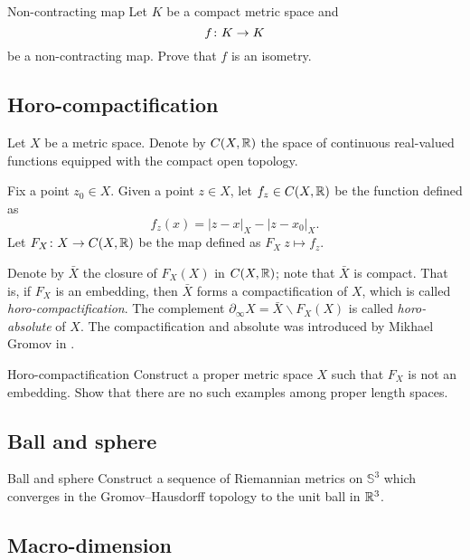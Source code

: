 \begin{pr}{\easy}{Non-contracting map}\label{Noncontracting map}
Let $K$  be a compact metric space and
\[f\:K\z\to K\] 
be a non-contracting map.
Prove that $f$ is an isometry.
\end{pr}


\subsection*{Horo-compactification\easy}

Let $X$ be a metric space.
Denote by $C(X,\mathbb{R})$ the space of continuous real-valued functions
equipped with the compact open topology.

Fix a point $z_0\in X$.
Given a point $z\in X$, let $f_z\in C(X,\mathbb{R})$ be the function defined as 
\[f_z(x)=|z-x|_X-|z-x_0|_X.\]
Let $F_X\colon X\to C(X,\mathbb{R})$ be the map 
defined as $F_X\:z\mapsto f_z$.

Denote by $\bar X$ 
the closure of $F_X(X)$ in $C(X,\mathbb{R})$;
note that $\bar X$ is compact.
That is, 
if $F_X$ is an embedding, 
then $\bar X$ forms a compactification of $X$,
which is called \emph{horo-compactification}.
The complement 
$\partial_\infty X=\bar X\backslash F_X(X)$ 
is called \emph{horo-absolute} of $X$.
The compactification
and absolute
was introduced by Mikhael Gromov in \cite{gromov-hyperbolic}.


\begin{pr}{\easy}{Horo-compactification}\label{Horo-compactification}
Construct a proper metric space $X$
such that $F_X$ is not an embedding.
Show that there are no such examples among proper length spaces.
\end{pr}

\subsection*{Ball and sphere}

\begin{pr}{}{Ball and sphere}\label{3-sphere is close to a ball}
Construct a sequence of Riemannian metrics on $\mathbb{S}^3$ 
which converges in the Gromov--Hausdorff topology 
to the unit ball in $\mathbb{R}^3$.
\end{pr}

\subsection*{Macro-dimension\easy}

